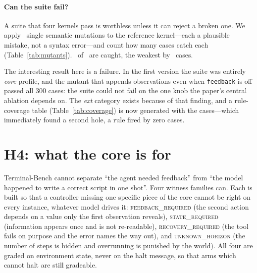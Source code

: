 \documentclass[11pt,a4paper]{article}
\newcommand{\widetable}[1]{\resizebox{\textwidth}{!}{}}
\begin{document}
\paragraph{Can the suite fail?}
A suite that four kernels pass is worthless unless it can reject a broken one.
We apply \muttotal\ single semantic mutations to the reference kernel---each a
plausible mistake, not a syntax error---and count how many cases catch each
(Table~\ref{tab:mutants}). \mutcaught\ of \muttotal\ are caught, the weakest by
\mutmin\ cases.

The interesting result here is a failure. In the first version the suite was
entirely \emph{core} profile, and the mutant that appends observations even
when \texttt{feedback} is off passed all 300 cases: the suite could not fail on
the one knob the paper's central ablation depends on. The \emph{ext} category
exists because of that finding, and a rule-coverage table
(Table~\ref{tab:coverage}) is now generated with the cases---which immediately
found a second hole, a rule fired by zero cases.

\begin{table}[h]\centering\small
\caption{Mutation testing of the conformance suite.}
\label{tab:mutants}
\widetable{gen/tab-mutants}
\end{table}

\section{H4: what the core is for}
\label{sec:h4}

Terminal-Bench cannot separate ``the agent needed feedback'' from ``the model
happened to write a correct script in one shot''. Four witness families can.
Each is built so that a controller missing one specific piece of the core
cannot be right on every instance, whatever model drives it:
\textsc{feedback\_required} (the second action depends on a value only the
first observation reveals), \textsc{state\_required} (information appears once
and is not re-readable), \textsc{recovery\_required} (the tool fails on purpose
and the error names the way out), and \textsc{unknown\_horizon} (the number of
steps is hidden and overrunning is punished by the world). All four are graded
on environment state, never on the halt message, so that arms which cannot halt
are still gradeable.

\begin{table}[h]\centering\small
\caption{Information ceiling per ablation arm: the oracle policy, 50 instances
per family, four kernels. No model is involved, so these numbers are properties
of the arm.}
\label{tab:oracle}

\end{table}
\end{document}
